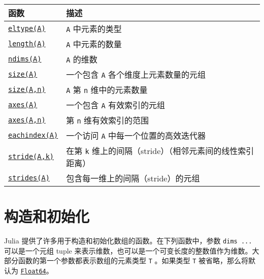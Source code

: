 \begin{table}[h]

\begin{tabulary}{\linewidth}{|L|L|}
\hline
函数 & 描述 \\
\hline
\hyperlink{6396209842929672718}{\texttt{eltype(A)}} & \texttt{A} 中元素的类型 \\
\hline
\hyperlink{3699181304419743826}{\texttt{length(A)}} & \texttt{A} 中元素的数量 \\
\hline
\hyperlink{1688406579181746010}{\texttt{ndims(A)}} & \texttt{A} 的维数 \\
\hline
\hyperlink{17888996102305087038}{\texttt{size(A)}} & 一个包含 \texttt{A} 各个维度上元素数量的元组 \\
\hline
\hyperlink{17888996102305087038}{\texttt{size(A,n)}} & \texttt{A} 第 \texttt{n} 维中的元素数量 \\
\hline
\hyperlink{7074821531920287868}{\texttt{axes(A)}} & 一个包含 \texttt{A} 有效索引的元组 \\
\hline
\hyperlink{7074821531920287868}{\texttt{axes(A,n)}} & 第 \texttt{n} 维有效索引的范围 \\
\hline
\hyperlink{4701773772897287974}{\texttt{eachindex(A)}} & 一个访问 \texttt{A} 中每一个位置的高效迭代器 \\
\hline
\hyperlink{97811245619734938}{\texttt{stride(A,k)}} & 在第 \texttt{k} 维上的间隔（stride）（相邻元素间的线性索引距离） \\
\hline
\hyperlink{13576557637670855932}{\texttt{strides(A)}} & 包含每一维上的间隔（stride）的元组 \\
\hline
\end{tabulary}

\end{table}



\hypertarget{10907259792659637782}{}


\section{构造和初始化}



Julia 提供了许多用于构造和初始化数组的函数。在下列函数中，参数 \texttt{dims ...} 可以是一个元组 tuple 来表示维数，也可以是一个可变长度的整数值作为维数。大部分函数的第一个参数都表示数组的元素类型 \texttt{T} 。如果类型 \texttt{T} 被省略，那么将默认为 \hyperlink{5027751419500983000}{\texttt{Float64}}。




